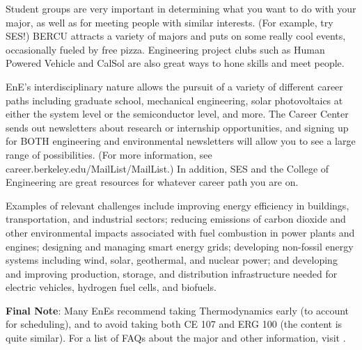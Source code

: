 Student groups are very important in determining what you want to do with your major, as well as for meeting people with similar interests. (For example, try SES!) BERCU attracts a variety of majors and puts on some really cool events, occasionally fueled by free pizza. Engineering project clubs such as Human Powered Vehicle and CalSol are also great ways to hone skills and meet people.
 
EnE’s interdisciplinary nature allows the pursuit of a variety of different career paths including graduate school, mechanical engineering, solar photovoltaics at either the system level or the semiconductor level, and more. The Career Center sends out newsletters about research or internship opportunities, and signing up for BOTH engineering and environmental newsletters will allow you to see a large range of possibilities. (For more information, see {\selectfont career.berkeley.edu/MailList/MailList}.) In addition, SES and the College of Engineering are great resources for whatever career path you are on.
 
Examples of relevant challenges include improving energy efficiency in buildings, transportation, and industrial sectors; reducing emissions of carbon dioxide and other environmental impacts associated with fuel combustion in power plants and engines; designing and managing smart energy grids; developing non-fossil energy systems including wind, solar, geothermal, and nuclear power; and developing and improving production, storage, and distribution infrastructure needed for electric vehicles, hydrogen fuel cells, and biofuels.

\textbf{Final Note}: Many EnEs recommend taking Thermodynamics early (to account for scheduling), and to avoid taking both CE 107 and ERG 100 (the content is quite similar). For a list of FAQs about the major and other information, visit {\selectfont {}}.

